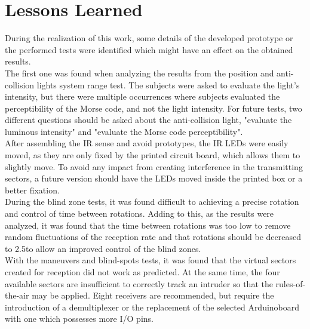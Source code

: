 \section{Lessons Learned}
\label{section:lessons}
During the realization of this work, some details of the developed prototype or the performed tests were identified which might have an effect on the obtained results.\\
The first one was found when analyzing the results from the position and anti-collision lights system range test. The subjects were asked to evaluate the light's intensity, but there were multiple occurrences where subjects evaluated the perceptibility of the Morse code, and not the light intensity. For future tests, two different questions should be asked about the anti-collision light, "evaluate the luminous intensity" and "evaluate the Morse code perceptibility".\\
After assembling the IR sense and avoid prototypes, the IR LEDs were easily moved, as they are only fixed by the printed circuit board, which allows them to slightly move. To avoid any impact from creating interference in the transmitting sectors, a future version should have the LEDs moved inside the printed box or a better fixation.\\
During the blind zone tests, it was found difficult to achieving a precise rotation and control of time between rotations. Adding to this, as the results were analyzed, it was found that the time between rotations was too low to remove random fluctuations of the reception rate and that rotations should be decreased to 2.5\degree to allow an improved control of the blind zones.\\
With the maneuvers and blind-spots tests, it was found that the virtual sectors created for reception did not work as predicted. At the same time, the four available sectors are insufficient to correctly track an intruder so that the rules-of-the-air may be applied. Eight receivers are recommended, but require the introduction of a demultiplexer or the replacement of the selected Arduino\texttrademark board with one which possesses more I/O pins.\\

\cleardoublepage

